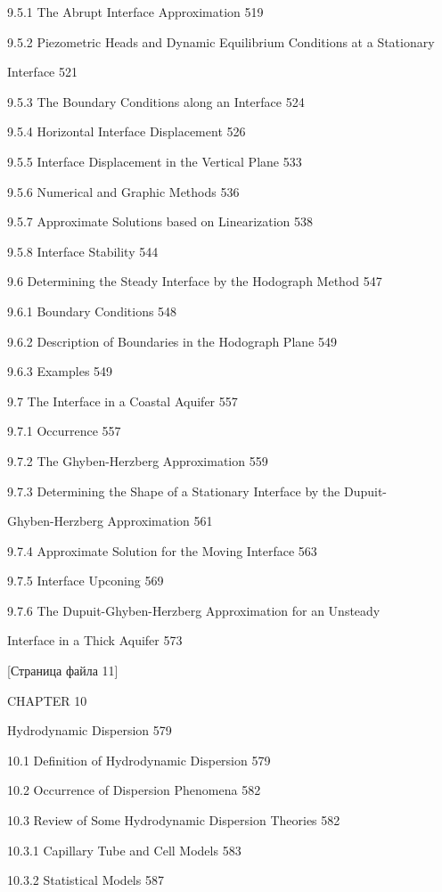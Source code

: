 \documentclass[
  11pt,
]{article}
\begin{document}
9.5.1 The Abrupt Interface Approximation 519 \par
9.5.2 Piezometric Heads and Dynamic Equilibrium Conditions at a Stationary \par
Interface 521 \par
9.5.3 The Boundary Conditions along an Interface 524 \par
9.5.4 Horizontal Interface Displacement 526 \par
9.5.5 Interface Displacement in the Vertical Plane 533 \par
9.5.6 Numerical and Graphic Methods 536 \par
9.5.7 Approximate Solutions based on Linearization 538 \par
9.5.8 Interface Stability 544 \par
9.6 Determining the Steady Interface by the Hodograph Method 547 \par
9.6.1 Boundary Conditions 548 \par
9.6.2 Description of Boundaries in the Hodograph Plane 549 \par
9.6.3 Examples 549 \par
9.7 The Interface in a Coastal Aquifer 557 \par
9.7.1 Occurrence 557 \par
9.7.2 The Ghyben-Herzberg Approximation 559 \par
9.7.3 Determining the Shape of a Stationary Interface by the Dupuit- \par
Ghyben-Herzberg Approximation 561 \par
9.7.4 Approximate Solution for the Moving Interface 563 \par
9.7.5 Interface Upconing 569 \par
9.7.6 The Dupuit-Ghyben-Herzberg Approximation for an Unsteady \par
Interface in a Thick Aquifer 573 \par
\smallskip
\smallskip
\smallskip
{[}Страница файла 11{]}\par
CHAPTER 10 \par
Hydrodynamic Dispersion 579 \par
10.1 Definition of Hydrodynamic Dispersion 579 \par
10.2 Occurrence of Dispersion Phenomena 582 \par
10.3 Review of Some Hydrodynamic Dispersion Theories 582 \par
10.3.1 Capillary Tube and Cell Models 583 \par
10.3.2 Statistical Models 587 \par
\end{document}
